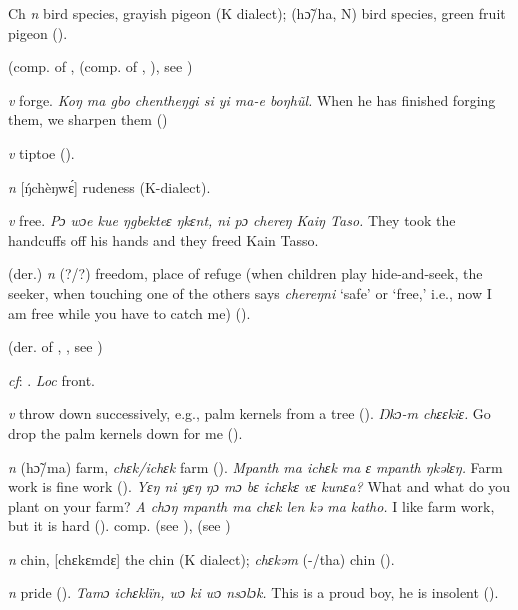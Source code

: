 \begin{letter}{Ch}
 \textit{n} bird species, grayish pigeon (K dialect); (hɔ̃/ha, N) bird species, green fruit pigeon (\citealt{Pichl1967}). 

 (comp. of ,  (comp. of , ), see ) 

 \textit{v} forge. \textit{Koŋ ma gbo chentheŋgi si yi ma-e boŋhũl.} When he has finished forging them, we sharpen them (\citealt{Pichl1967})

 \textit{v} tiptoe (\citealt{Pichl1967}). 

 \textit{n} [ŋ́chèŋwɛ́] rudeness (K-dialect).

 \textit{v} free. \textit{Pɔ wɔe kue ŋgbekteɛ ŋkɛnt, ni pɔ chereŋ Kaiŋ Taso.} They took the handcuffs off his hands and they freed Kain Tasso.

 (der.) \textit{n} (?/?) freedom, place of refuge (when children play hide-and-seek, the seeker, when touching one of the others says \textit{chereŋni} ‘safe' or ‘free,' i.e., now I am free while you have to catch me) (\citealt{Pichl1967}). 

 (der. of , , see ) 

 \textit{cf}: . \textit{Loc} front.

 \textit{v} throw down successively, e.g., palm kernels from a tree (\citealt{Pichl1967}). \textit{Ŋkɔ-m chɛɛkiɛ.} Go drop the palm kernels down for me (\citealt{Pichl1967}). 

 \textit{n} (hɔ̃/ma) farm, \textit{chɛk/ichɛk } farm (\citealt{Pichl1967}). \textit{Mpanth ma ichɛk ma ɛ mpanth ŋkəlɛŋ.} Farm work is fine work (\citealt{Pichl1967}). \textit{Yɛŋ ni yɛŋ ŋɔ mɔ bɛ ichɛkɛ vɛ kunɛa?} What and what do you plant on your farm? \textit{A chɔŋ mpanth ma chɛk len kə ma katho.} I like farm work, but it is hard (\citealt{Pichl1967}). comp.  (see ),  (see ) 

 \textit{n} chin, [chɛkɛmdɛ] the chin (K dialect); \textit{chɛkəm} (-/tha) chin (\citealt{Pichl1967}).

 \textit{n} pride (\citealt{Pichl1967}). \textit{Tamɔ ichɛklïn, wɔ ki wɔ nsɔlɔk.} This is a proud boy, he is insolent (\citealt{Pichl1967}). 


\end{letter}
